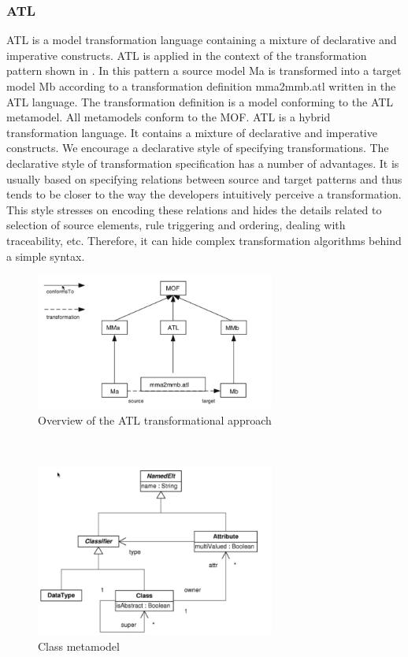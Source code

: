\documentclass{llncs}
\begin{document}
\subsubsection{ATL}
ATL is a model transformation language containing a mixture of declarative and
imperative constructs. ATL is applied in the context of the
transformation pattern shown in \label{fig:overview_atl}. In this pattern a source model Ma is transformed into a target model Mb according to a transformation definition mma2mmb.atl written in the ATL language. The transformation definition is a model conforming to the ATL metamodel. All metamodels conform to the MOF.
ATL is a hybrid transformation language. It contains a mixture of declarative
and imperative constructs. We encourage a declarative style of specifying transformations. The declarative style of transformation specification has a number of advantages. It is usually based on specifying relations between source and target patterns and thus tends to be closer to the way the developers intuitively perceive a transformation. This style stresses on encoding these relations and hides the details related to selection of source elements, rule triggering and ordering, dealing with traceability, etc. Therefore, it can hide complex transformation algorithms behind a simple syntax.\cite{atl:frederic}

\begin{figure}
	\centering
	\includegraphics[width=0.7\textwidth,natwidth=610,natheight=642]{figures/Overview_ATL.jpg}
	\caption{Overview of the ATL transformational approach}
	\label{fig:overview_atl}
\end{figure}~\cite{atl:frederic}

\begin{figure}
	\centering
	\includegraphics[width=0.7\textwidth,natwidth=610,natheight=642]{figures/Class_metamodel.jpg}
	\caption{Class metamodel}
	\label{fig:class_metamodel_atl}
\end{figure}~\cite{atl:frederic}
\end{document}
